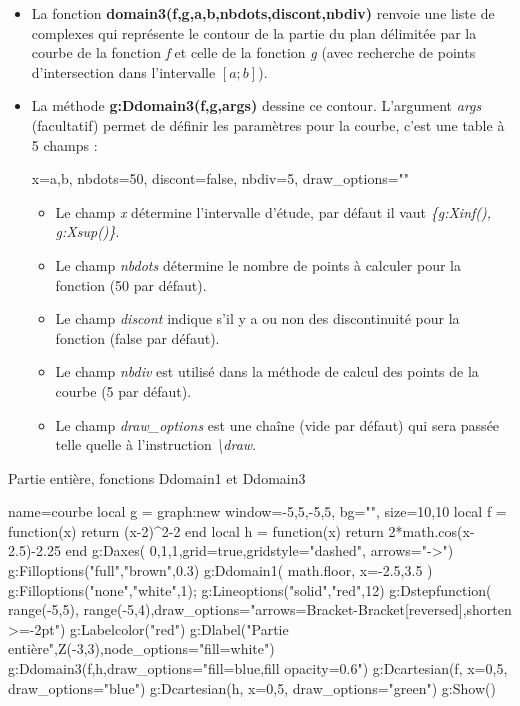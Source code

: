 \begin{itemize}
    \item La fonction \textbf{domain3(f,g,a,b,nbdots,discont,nbdiv)} renvoie une liste de complexes qui représente le contour de la partie du plan délimitée par la courbe de la fonction \emph{f} et celle de la fonction \emph{g} (avec recherche de points d'intersection dans l'intervalle $[a;b]$).
 
    \item La méthode \textbf{g:Ddomain3(f,g,args)} dessine ce contour. L'argument \emph{args} (facultatif) permet de définir les paramètres pour la courbe, c'est une table à 5 champs : 

\begin{TeXcode}
    { x={a,b}, nbdots=50, discont=false, nbdiv=5, draw_options="" }
\end{TeXcode}

\begin{itemize}
  \item Le champ \emph{x} détermine l'intervalle d'étude, par défaut il vaut \emph{\{g:Xinf(), g:Xsup()\}}.
  \item Le champ \emph{nbdots} détermine le nombre de points à calculer pour la fonction (50 par défaut).
  \item Le champ \emph{discont} indique s'il y a ou non des discontinuité pour la fonction (false par défaut).
  \item Le champ \emph{nbdiv} est utilisé dans la méthode de calcul des points de la courbe (5 par défaut).
  \item Le champ \emph{draw\_options} est une chaîne (vide par défaut) qui sera passée telle quelle à l'instruction \emph{\textbackslash draw}.
\end{itemize}
\end{itemize}

\begin{demo}{Partie entière, fonctions Ddomain1 et Ddomain3}
\begin{luadraw}{name=courbe}
local g = graph:new{ window={-5,5,-5,5}, bg="", size={10,10} }
local f = function(x) return (x-2)^2-2 end
local h = function(x) return 2*math.cos(x-2.5)-2.25 end
g:Daxes( {0,1,1},{grid=true,gridstyle="dashed", arrows="->"})
g:Filloptions("full","brown",0.3)
g:Ddomain1( math.floor, { x={-2.5,3.5} })
g:Filloptions("none","white",1); g:Lineoptions("solid","red",12)
g:Dstepfunction( {range(-5,5), range(-5,4)},{draw_options="arrows={Bracket-Bracket[reversed]},shorten >=-2pt"})
g:Labelcolor("red")
g:Dlabel("Partie entière",Z(-3,3),{node_options="fill=white"})
g:Ddomain3(f,h,{draw_options="fill=blue,fill opacity=0.6"})
g:Dcartesian(f, {x={0,5}, draw_options="blue"})
g:Dcartesian(h, {x={0,5}, draw_options="green"})
g:Show()
\end{luadraw}
\end{demo}

